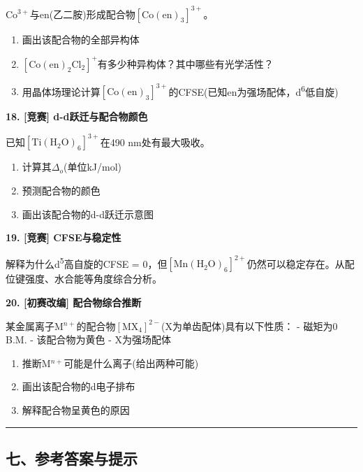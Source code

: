 \(\mathrm{Co^{3+}}\)与en(乙二胺)形成配合物\(\mathrm{[Co(en)_3]^{3+}}\)。

\begin{enumerate}
\def\labelenumi{(\alph{enumi})}
\tightlist
\item
  画出该配合物的全部异构体
\item
  \(\mathrm{[Co(en)_2Cl_2]^+}\)有多少种异构体？其中哪些有光学活性？
\item
  用晶体场理论计算\(\mathrm{[Co(en)_3]^{3+}}\)的CFSE(已知en为强场配体，d\textsuperscript{6}低自旋)
\end{enumerate}

\textbf{18. {[}竞赛{]} d-d跃迁与配合物颜色}

已知\(\mathrm{[Ti(H_2O)_6]^{3+}}\)在490 nm处有最大吸收。

\begin{enumerate}
\def\labelenumi{(\alph{enumi})}
\tightlist
\item
  计算其\(\Delta_o\)(单位kJ/mol)
\item
  预测配合物的颜色
\item
  画出该配合物的d-d跃迁示意图
\end{enumerate}

\textbf{19. {[}竞赛{]} CFSE与稳定性}

解释为什么d\textsuperscript{5}高自旋的CFSE = 0，但\(\mathrm{[Mn(H_2O)_6]^{2+}}\)仍然可以稳定存在。从配位键强度、水合能等角度综合分析。

\textbf{20. {[}初赛改编{]} 配合物综合推断}

某金属离子M\(^{n+}\)的配合物\(\mathrm{[MX_4]^{2-}}\)(X为单齿配体)具有以下性质：
- 磁矩为0 B.M.
- 该配合物为黄色
- X为强场配体

\begin{enumerate}
\def\labelenumi{(\alph{enumi})}
\tightlist
\item
  推断M\(^{n+}\)可能是什么离子(给出两种可能)
\item
  画出该配合物的d电子排布
\item
  解释配合物呈黄色的原因
\end{enumerate}

\begin{center}\rule{0.5\linewidth}{0.5pt}\end{center}

\subsection{七、参考答案与提示}\label{ux4e03ux53c2ux8003ux7b54ux6848ux4e0eux63d0ux793a}

